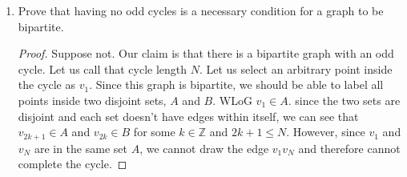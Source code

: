 \documentclass[11pt]{article}
\theoremstyle{solstyle}
\newtheorem*{solution}{Solution}
\newcommand{\glabel}[1]{\begin{center}\textbf{[Graph #1]}\end{center}}
\begin{document}
\begin{enumerate}[leftmargin=*]
\begin{enumerate}[label=(\alph*),leftmargin=*]
\begin{proof}
\begin{center}
\begin{tikzpicture}[scale=0.92]
\end{tikzpicture}
\end{center}
\glabel{II}
\end{proof}
\item All Hamiltonian graphs are Eulerian.
\begin{solution}
    Disproved. 
\end{solution}
\begin{proof}
Counterexample. 
\begin{center}
\end{center}
\glabel{III}
\end{proof}
\item All 2-connected, Eulerian graphs are Hamiltonian.
\begin{solution}
    Disproved. 
\end{solution}
\begin{proof}
Let us tighten the given constraints. 2-connectedness is included in the definition of toughness, in the special case of $n_r=2$, where $n_r$ shows the number of removed vertices. Therefore, if the claim is disproved for a tough graph, it will be disproved for a 2-connected graph. 

However, a 2-connected, Eulerian graph is known not to result in a Hamiltonian graph via the Harris graph disproval. Therefore, any Harris graph is a counterexample to this claim. 
\end{proof}

\end{enumerate}
\item Prove that having no odd cycles is a necessary condition for a graph to be bipartite.
\begin{proof}
Suppose not. Our claim is that there is a bipartite graph with an odd cycle. Let us call that cycle length $N$. Let us select an arbitrary point inside the cycle as $v_1$. Since this graph is bipartite, we should be able to label all points inside two disjoint sets, $A$ and $B$. WLoG $v_1 \in A$. since the two sets are disjoint and each set doesn't have edges within itself, we can see that $v_{2k+1} \in A$ and $v_{2k} \in B$ for some $k \in \mathbb{Z}$ and $2k+1 \leq N$. However, since $v_1$ and $v_{N}$ are in the same set $A$, we cannot draw the edge $v_1 v_{N}$ and therefore cannot complete the cycle. 


\end{proof}
\end{enumerate}
\end{document}
